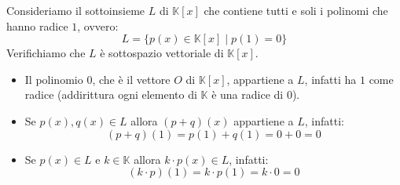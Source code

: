 \begin{example}
	Consideriamo il sottoinsieme $L$ di $\mathbb{K}[x]$ che contiene tutti
	e soli i polinomi che hanno radice $1$, ovvero:
	\begin{equation*}
		L = \{p(x) \in \mathbb{K}[x] \mid p(1) = 0\}
	\end{equation*}
	Verifichiamo che $L$ \`e sottospazio vettoriale di $\mathbb{K}[x]$.
	\begin{itemize}
		\item
		      Il polinomio $0$, che \`e il vettore $O$ di $\mathbb{K}[x]$,
		      appartiene a $L$, infatti ha $1$ come radice (addirittura ogni
		      elemento di $\mathbb{K}$ \`e una radice di $0$).
		\item
		      Se $p(x), q(x) \in L$ allora $(p + q)(x)$ appartiene a $L$,
		      infatti:
		      \begin{equation*}
			      (p + q)(1) = p(1) + q(1) = 0 + 0 = 0
		      \end{equation*}
		\item
		      Se $p(x) \in L$ e $k \in \mathbb{K}$ allora $k \cdot p(x) \in L$,
		      infatti:
		      \begin{equation*}
			      (k \cdot p)(1) = k \cdot p(1) = k \cdot 0 = 0
		      \end{equation*}
	\end{itemize}
\end{example}